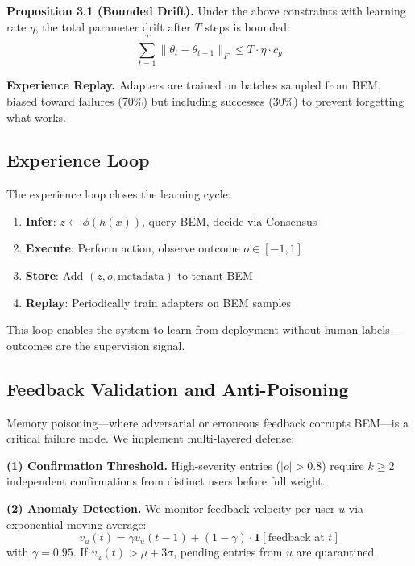 \documentclass[twoside,11pt]{article}
\begin{document}
\textbf{Proposition 3.1 (Bounded Drift).} Under the above constraints with learning rate $\eta$, the total parameter drift after $T$ steps is bounded:
\begin{equation}
    \sum_{t=1}^T \|\theta_t - \theta_{t-1}\|_F \leq T \cdot \eta \cdot c_g
\end{equation}

\textbf{Experience Replay.} Adapters are trained on batches sampled from BEM, biased toward failures (70\%) but including successes (30\%) to prevent forgetting what works.

\subsection{Experience Loop}

The experience loop closes the learning cycle:
\begin{enumerate}
    \item \textbf{Infer}: $z \leftarrow \phi(h(x))$, query BEM, decide via Consensus
    \item \textbf{Execute}: Perform action, observe outcome $o \in [-1, 1]$
    \item \textbf{Store}: Add $(z, o, \text{metadata})$ to tenant BEM
    \item \textbf{Replay}: Periodically train adapters on BEM samples
\end{enumerate}

This loop enables the system to learn from deployment without human labels---outcomes are the supervision signal.

\subsection{Feedback Validation and Anti-Poisoning}
\label{sec:antipoisoning}

Memory poisoning---where adversarial or erroneous feedback corrupts BEM---is a critical failure mode. We implement multi-layered defense:

\textbf{(1) Confirmation Threshold.} High-severity entries ($|o| > 0.8$) require $k \geq 2$ independent confirmations from distinct users before full weight.

\textbf{(2) Anomaly Detection.} We monitor feedback velocity per user $u$ via exponential moving average:
\begin{equation}
    v_u(t) = \gamma v_u(t-1) + (1-\gamma) \cdot \mathbf{1}[\text{feedback at } t]
\end{equation}
with $\gamma = 0.95$. If $v_u(t) > \mu + 3\sigma$, pending entries from $u$ are quarantined.
\end{document}
